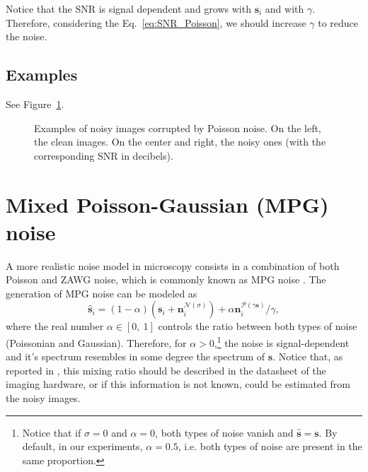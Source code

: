 Notice that the SNR is signal dependent and grows with $\mathbf{s}_i$ and with
$\gamma$. Therefore, considering the Eq.~\ref{eq:SNR_Poisson}, we should increase
$\gamma$ to reduce the noise.

\subsection*{Examples}

See Figure~\ref{fig:Poisson_examples}.

\begin{figure}
  \centering
  \caption{Examples of noisy images corrupted by Poisson noise. On the
    left, the clean images. On the center and right, the noisy ones (with the
    corresponding \gls{SNR} in
    decibels). \label{fig:Poisson_examples}}
\end{figure}


\section{Mixed Poisson-Gaussian (MPG) noise}

A more realistic noise model in microscopy consists in a combination
of both Poisson and \gls{ZAWG} noise, which is commonly known as
\gls{MPG} noise \cite{meiniel2018denoising}. The generation of
\gls{MPG} noise can be modeled as
\begin{equation}
  \hat{\mathbf{s}}_i = (1-\alpha)(\mathbf{s}_i + \mathbf{n}^{\mathcal{N}(\sigma)}_i) + \alpha\mathbf{n}^{\mathcal{P}(\gamma\mathbf{s})}_i/\gamma,
  \label{eq:MPG_noise_model} 
\end{equation}
where the real number $\alpha\in[0,~1]$ controls the ratio between
both types of noise (Poissonian and Gaussian). Therefore, for
$\alpha > 0$,\footnote{Notice that if $\sigma=0$ and $\alpha=0$, both
  types of noise vanish and $\hat{\mathbf{s}}=\mathbf{s}$. By default,
  in our experiments, $\alpha=0.5$, i.e. both types of noise are
  present in the same proportion.} the noise is signal-dependent and
it's spectrum resembles in some degree the spectrum of
$\mathbf{s}$. Notice that, as reported in \cite{foi2008practical},
this mixing ratio should be described in the datasheet of the imaging
hardware, or if this information is not known, could be estimated from
the noisy images.

